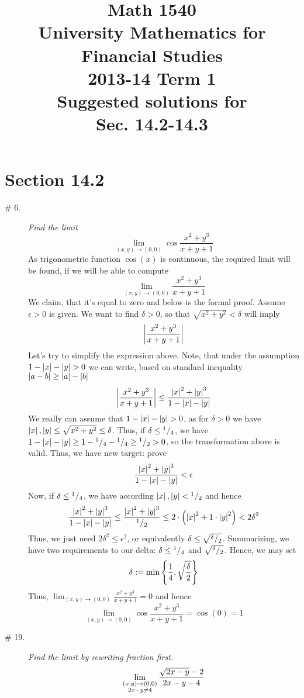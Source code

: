 \documentclass[8pt]{article} %
\title{Math 1540\\University Mathematics for Financial Studies\\2013-14 Term 1\\Suggested solutions for\\
Sec. 14.2-14.3}
\begin{document}
\maketitle
\section{Section 14.2}
\begin{description}
	\item[\# 6.]{{\it Find the limit}\[\lim_{(x,y)\to(0,0)}\cos\frac{x^2+y^3}{x+y+1}\]
		}
		As trigonometric function $\cos(x)$ is continuous, the required limit will be found, if we will be able to compute
		\[\lim_{(x,y)\to(0,0)}\frac{x^2+y^3}{x+y+1}\]
		We claim, that it's equal to zero and below is the formal proof. Assume $\epsilon>0$ is given. We want to find $
		\delta>0$, so that $\sqrt{x^2+y^2}<\delta$ will imply
		\[\left|\frac{x^2+y^3}{x+y+1}\right|\]
		Let's try to simplify the expression above. Note, that under the assumption $1-\myabs{x}-\myabs{y}>0$ we can write,
		based on standard inequality $\left|a-b\right|\geq\left|a\right|-\left|b\right|$
		\[\left|\frac{x^2+y^3}{x+y+1}\right|\leq\frac{\left|x\right|^2+\left|y\right|^3}{1-\left|x\right|-\left|y\right|}\]
		We really can assume that $1-\myabs{x}-\myabs{y}>0$, as for $\delta>0$ we have $\left|x\right|,\left|y\right|\leq\sqrt{x^2+
		y^2}\leq\delta$. Thus, if $\delta\leq{^{1}/_{4}}$, we have $1-\left|x\right|-\left|y\right|\geq 1-{^{1}/_{4}}-{^{1}/_{4}}
		\geq{^{1}/_{2}}>0$, so the transformation above is valid. Thus, we have new target: prove
		\[\frac{\left|x\right|^2+\left|y\right|^3}{1-\left|x\right|-\left|y\right|}<\epsilon\]
		Now, if $\delta\leq{^{1}/_{4}}$, we have according $\left|x\right|,\left|y\right|<{^{1}/_{2}}$ and hence
		\[\frac{\left|x\right|^2+\left|y\right|^3}{1-\left|x\right|-\left|y\right|}\leq
		\frac{\left|x\right|^2+\left|y\right|^3}{{^{1}/_{2}}}\leq2\cdot\left(\left|x\right|^2+1\cdot\left|y\right|^2\right)<2\delta^2\]
		Thus, we just need $2\delta^2\leq\epsilon^2$, or equivalently $\delta\leq\sqrt{{^{\delta}/_{2}}}$. Summarizing,
		we have two requirements to our delta: $\delta\leq{^{1}/_{4}}$ and $\sqrt{{^{\delta}/_{2}}}$. Hence, we may set
		\[\delta:=\min\mycbra{\frac{1}{4},\sqrt{\frac{\delta}{2}}}\]
		Thus, $\lim_{(x,y)\to(0,0)}\frac{x^2+y^3}{x+y+1}=0$ and hence
		\[\lim_{(x,y)\to(0,0)}\cos\frac{x^2+y^3}{x+y+1}=\cos(0)=1\]
	\item[\# 19.]{{\it Find the limit by rewriting fraction first.}
		\[\lim_{\begin{subarray}{c}(x,y)\to(0,0)\\2x-y\neq4\end{subarray}}\frac{\sqrt{2x-y}-2}{2x-y-4}\]
}
\end{description}
\end{document}
